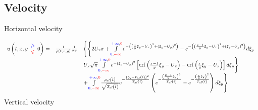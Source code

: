 \subsection{Velocity}
Horizontal velocity

\begin{equation*}
\begin{array}{ r r l }
u\left( t,x,y\begin{array}{ c }
\textcolor[rgb]{0,0,1}{\geqslant }\\
\textcolor[rgb]{1,0,0}{\leqslant }
\end{array} 0\right) = & \frac{1}{\rho (t,x,y)}\frac{1}{2\pi } & \left\{\left\{2U_{x} \pi +\int\limits _{\textcolor[rgb]{0,0,1}{0} ,\textcolor[rgb]{1,0,0}{-\infty }}^{\textcolor[rgb]{0,0,1}{+\infty } ,\textcolor[rgb]{1,0,0}{0}} e^{-\left(\left(\frac{x}{y} \xi _{y} -U_{x}\right)^{2} +( \xi _{y} -U_{y})^{2}\right)} -e^{-\left(\left(\frac{x-1}{y} \xi _{y} -U_{x}\right)^{2} +( \xi _{y} -U_{y})^{2}\right)} d\xi _{y}\right. \right. \\
 &  & \left. U_{x}\sqrt{\pi }\int\limits _{\textcolor[rgb]{0,0,1}{0} ,\textcolor[rgb]{1,0,0}{-\infty }}^{\textcolor[rgb]{0,0,1}{+\infty } ,\textcolor[rgb]{1,0,0}{0}} e^{-( \xi _{y} -U_{y})^{2}}\left[\mathrm{erf}\left(\frac{x-1}{y} \xi _{y} -U_{x}\right) -\mathrm{erf}\left(\frac{x}{y} \xi _{y} -U_{x}\right)\right] d\xi _{y}\right\}\\
 &  & \left. +\int\limits _{\textcolor[rgb]{0,0,1}{0} ,\textcolor[rgb]{1,0,0}{-\infty }}^{\textcolor[rgb]{0,0,1}{+\infty } ,\textcolor[rgb]{1,0,0}{0}}\frac{\rho _{\text{af}}\left(\tilde{t}\right)}{\sqrt{T_{\text{af}}\left(\tilde{t}\right)}} e^{-\frac{\left( \xi _{y} -V_{\text{af}}\left(\tilde{t}\right)\right)^{2}}{T_{\text{af}}\left(\tilde{t}\right)}}\left( e^{-\frac{\left(\frac{x-1}{y} \xi _{y}\right)^{2}}{T_{\text{af}}\left(\tilde{t}\right)}} -e^{-\frac{\left(\frac{x}{y} \xi _{y}\right)^{2}}{T_{\text{af}}\left(\tilde{t}\right)}}\right) d\xi _{y}\right\}
\end{array}
\end{equation*}
Vertical velocity
